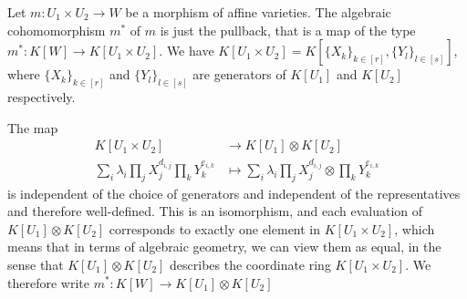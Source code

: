 \begin{definition}\label{coh}

  Let $m \colon U_1 \times U_2 \longrightarrow W$ be a morphism of affine varieties.
  The algebraic cohomomorphism $m^\ast$ of $m$ is just the pullback, that is a map of the type $m^\ast \colon K[W] \longrightarrow K[U_1 \times U_2]$.
  We have $ K[U_1 \times U_2] = K[\{X_k\}_{k\in[r]},\{Y_l\}_{l\in[s]}]$, where $\{X_k\}_{k\in[r]}$ and $\{Y_l\}_{l\in[s]}$ are generators of $K[U_1]$ and $K[U_2]$ respectively.
  
  
  The map
    \begin{equation}
    \begin{aligned}
      K[U_1 \times U_2]
      & \longrightarrow K[U_1] \otimes K[U_2]\\
      \sum_i \lambda_i \prod_j X_{j}^{d_{i,j}} \prod_k Y_{k}^{e_{i,k}} &\longmapsto \sum_i \lambda_i \prod_j X_{j}^{d_{i,j}} \otimes \prod_k Y_{k}^{e_{i,k}}
    \end{aligned}
  \end{equation}
  is independent of the choice of generators and independent of the representatives and therefore well-defined.
  This is an isomorphism, and each evaluation of $K[U_1]\otimes K[U_2]$ corresponds to exactly one element in $K[U_1 \times U_2]$, which means that in terms of algebraic geometry, we can view them as equal, in the sense that $K[U_1]\otimes K[U_2]$ describes the coordinate ring $K[U_1 \times U_2]$.
  We therefore write $m^\ast \colon K[W]\longrightarrow K[U_1]\otimes K[U_2]$
\end{definition}

